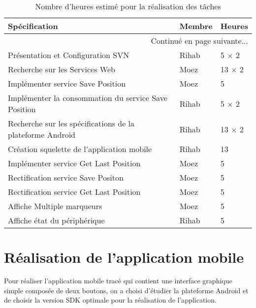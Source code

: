 \begin{center}
    \begin{longtable}{| l | l | l |}
        \caption{Nombre d'heures estimé pour la réalisation des tâches}
\label{tab:sprint1-estimation} \\

        \hline
        \textbf{Spécification} & \textbf{Membre} & \textbf{Heures} \\ \hline
        \endhead

        \hline \multicolumn{3}{|r|}{{Continué en page suivante$\dotsc$}} \\ \hline
        \endfoot

        \hline \hline
        \endlastfoot

        \hline
Présentation et Configuration SVN & Rihab & 5 $\times$ 2 \\ \hline
Recherche sur les Services Web & Moez & 13 $\times$ 2 \\ \hline
Implémenter service Save Position & Moez & 5 \\ \hline
Implémenter la consommation du service Save Position & Rihab & 5 $\times$ 2 \\ \hline
Recherche sur les spécifications de la plateforme Android & Rihab & 13 $\times$ 2 \\ \hline
Création squelette de l'application mobile & Rihab & 13 \\ \hline
Implémenter service Get Last Position & Moez & 5 \\ \hline
Rectification service Save Positon & Moez & 5 \\ \hline
Rectification service Get Last Position & Moez & 5 \\ \hline
Affiche Multiple marqueurs & Moez & 5 \\ \hline
Affiche état du périphérique & Rihab & 5 \\ \hline
    \end{longtable}
\end{center}

\section{Réalisation de l'application mobile}

Pour réaliser l'application mobile tracé qui contient une interface graphique
simple composée de deux boutons, on a choisi d'étudier la plateforme Android et
de choisir la version SDK optimale pour la réalisation de l'application.

